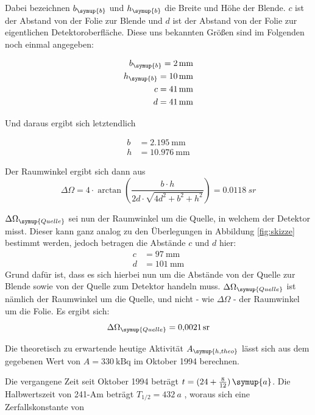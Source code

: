 Dabei bezeichnen $b_\symup{b}$ und $h_\symup{b}$ die Breite und Höhe der Blende.
$c$ ist der Abstand von der Folie zur Blende und $d$ ist der Abstand von der Folie
zur eigentlichen Detektoroberfläche. Diese uns bekannten Größen \cite{sample1} sind
im Folgenden noch einmal angegeben:

\begin{align*}
  b_\symup{b} = \SI{2}{\milli\meter} \\
  h_\symup{b} = \SI{10}{\milli\meter} \\
  c = \SI{41}{\milli\meter} \\
  d = \SI{41}{\milli\meter}
\end{align*}

Und daraus ergibt sich letztendlich

\begin{align*}
  b &= \SI{2.195}{\milli\meter} \\
  h &= \SI{10.976}{\milli\meter}
\end{align*}

Der Raumwinkel ergibt sich dann aus \cite{sample2}
\begin{equation}
  \Delta \Omega = 4 \cdot \arctan\left(\frac{b \cdot h}{2d \cdot \sqrt{4d^2 + b^2 + h^2}}\right) = \SI{0.0118}{sr}
\end{equation}

$\Delta \Omega_{\symup{Quelle}}$ sei nun der Raumwinkel um die Quelle, in welchem der Detektor misst.
Dieser kann ganz analog zu den Überlegungen in Abbildung \ref{fig:skizze} bestimmt werden, jedoch betragen die
Abstände $c$ und $d$ hier:
\begin{align*}
  c &= \SI{97}{\milli\meter} \\
  d &= \SI{101}{\milli\meter}
\end{align*}
Grund dafür ist, dass es sich hierbei nun um die Abstände von der Quelle zur Blende
sowie von der Quelle zum Detektor handeln muss. $\Delta \Omega_{\symup{Quelle}}$ ist nämlich
der Raumwinkel um die Quelle, und nicht - wie $\Delta \Omega$ - der Raumwinkel um die Folie.
Es ergibt sich:
\begin{equation*}
  \Delta \Omega_{\symup{Quelle}} = \SI{0.0021}{sr}
\end{equation*}

Die theoretisch zu erwartende heutige Aktivität $A_{\symup{h,theo}}$ lässt sich aus dem gegebenen Wert von
$A = \SI{330}{\kilo\becquerel}$ \cite{sample1} im Oktober 1994 berechnen.

Die vergangene Zeit seit Oktober 1994 beträgt $t= (24 + \frac{8}{12})\,\symup{a}$.
Die Halbwertszeit von 241-Am beträgt $T_{1/2} = \SI{432}{a}$ \cite{sample8}, woraus sich eine
Zerfallskonstante von

